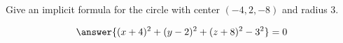 \documentclass{ximera}
\author{Bart Snapp}
\begin{document}
\begin{exercise}
  Give an implicit formula for the circle with center $(-4,2,-8)$ and radius $3$.
  \begin{prompt}
  \[
  \answer{(x+4)^2 + (y-2)^2 + (z+8)^2-3^2}=0
  \]
  \end{prompt}
\end{exercise}
\end{document}

